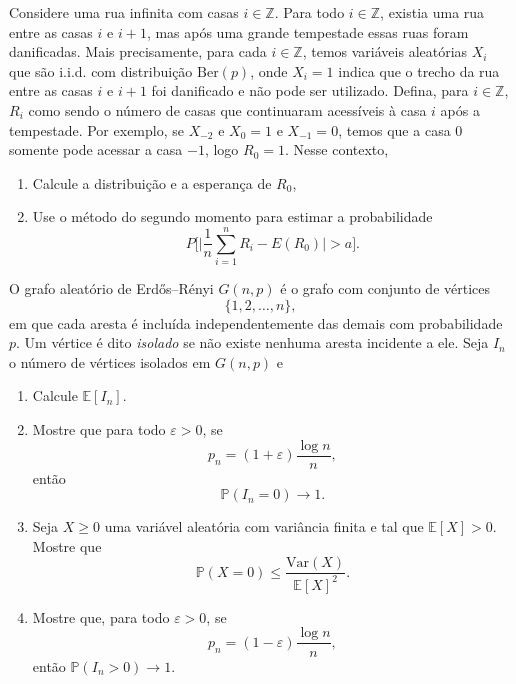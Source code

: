\begin{exercise}
  \label{x:casas_tempestade}
  Considere uma rua infinita com casas $i \in \mathbb{Z}$.
  Para todo $i \in \mathbb{Z}$, existia uma rua entre as casas $i$ e $i+1$, mas após uma grande tempestade essas ruas foram danificadas.
  Mais precisamente, para cada $i \in \mathbb{Z}$, temos variáveis aleatórias $X_i$ que são i.i.d. com distribuição $\text{Ber}(p)$, onde $X_i = 1$ indica que o trecho da rua entre as casas $i$ e $i + 1$ foi danificado e não pode ser utilizado.
  Defina, para $i \in \mathbb{Z}$, $R_i$ como sendo o número de casas que continuaram acessíveis à casa $i$ após a tempestade.
  Por exemplo, se $X_{-2}$ e $X_0 = 1$ e $X_{-1} = 0$, temos que a casa $0$ somente pode acessar a casa $-1$, logo $R_0 = 1$.
  Nesse contexto,
  \begin{enumerate}[\quad a)]
  \item Calcule a distribuição e a esperança de $R_0$,
  \item Use o método do segundo momento para estimar a probabilidade
    \begin{equation}
      P \Big[ \Big| \frac{1}{n} \sum_{i=1}^n R_i - E(R_0) \Big| > a \Big].
    \end{equation}
  \end{enumerate}
\end{exercise}


\begin{exercise}
  O grafo aleatório de Erdős--Rényi $G(n,p)$ é o grafo com conjunto de vértices
\begin{equation}
\{1,2,\dots,n\},
\end{equation}
em que cada aresta é incluída independentemente das demais com probabilidade $p$.
Um vértice é dito \emph{isolado} se não existe nenhuma aresta incidente a ele.
Seja $I_n$ o número de vértices isolados em $G(n,p)$ e
\begin{enumerate}[\quad a)]
    \item Calcule $\mathbb E[I_n]$.

    \item Mostre que para todo $\varepsilon > 0$, se
    \begin{equation}
    p_n = (1 + \varepsilon) \frac{\log n}{n},
    \end{equation}
    então
    \begin{equation}
    \mathbb P(I_n=0)\to1.
    \end{equation}
  \item Seja \(X\ge0\) uma variável aleatória com variância finita e tal que $\mathbb E[X] > 0$.
Mostre que
\begin{equation}
\mathbb P(X=0)
\le
\frac{\mathrm{Var}(X)}{\mathbb E[X]^2}.
\end{equation}
    \item Mostre que, para todo $\varepsilon > 0$, se
    \begin{equation}
    p_n = (1 - \varepsilon) \frac{\log n}{n},
    \end{equation}
    então $\mathbb P(I_n>0)\to1$.
\end{enumerate}
\end{exercise}





